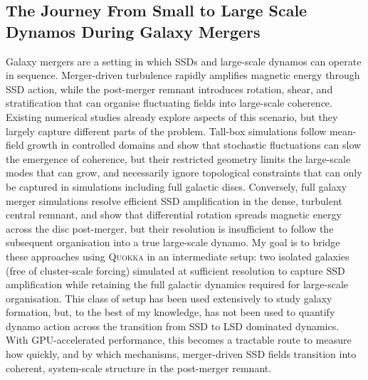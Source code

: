 \documentclass[12pt,twoside]{extreport}
\newcommand{\eg}{e.g.,\xspace} %
\begin{document}
\subsection{The Journey From Small to Large Scale Dynamos During Galaxy Mergers}

Galaxy mergers are a setting in which SSDs and large-scale dynamos can operate in sequence. Merger-driven turbulence rapidly amplifies magnetic energy through SSD action, while the post-merger remnant introduces rotation, shear, and stratification that can organise fluctuating fields into large-scale coherence. Existing numerical studies already explore aspects of this scenario, but they largely capture different parts of the problem. Tall-box simulations \citep[\eg][]{gent2023transition} follow mean-field growth in controlled domains and show that stochastic fluctuations can slow the emergence of coherence, but their restricted geometry limits the large-scale modes that can grow, and necessarily ignore topological constraints that can only be captured in simulations including full galactic discs. Conversely, full galaxy merger simulations \citep[\eg][]{whittingham2021impact, whittingham2023impact} resolve efficient SSD amplification in the dense, turbulent central remnant, and show that differential rotation spreads magnetic energy across the disc post-merger, but their resolution is insufficient to follow the subsequent organisation into a true large-scale dynamo. My goal is to bridge these approaches using \textsc{Quokka} in an intermediate setup: two isolated galaxies (free of cluster-scale forcing) simulated at sufficient resolution to capture SSD amplification while retaining the full galactic dynamics required for large-scale organisation. This class of setup has been used extensively to study galaxy formation, but, to the best of my knowledge, has not been used to quantify dynamo action across the transition from SSD to LSD dominated dynamics. With GPU-accelerated performance, this becomes a tractable route to measure how quickly, and by which mechanisms, merger-driven SSD fields transition into coherent, system-scale structure in the post-merger remnant.
\end{document}
